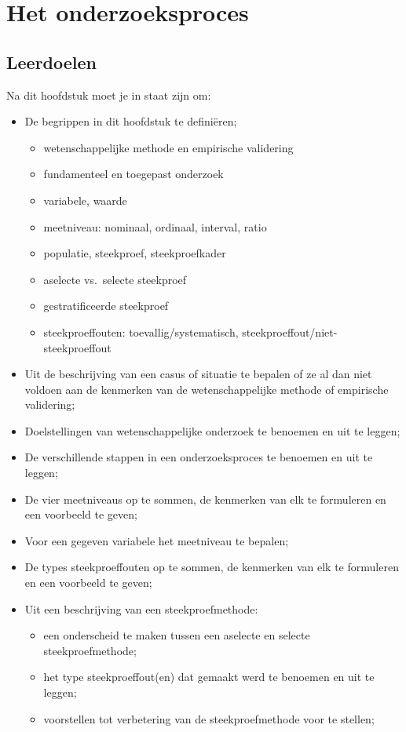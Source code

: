 \chapter{Het onderzoeksproces}
\label{ch:onderzoeksproces}

\section{Leerdoelen}
\label{sec:onderzoeksproces-leerdoelen}

Na dit hoofdstuk moet je in staat zijn om:

\begin{itemize}
  \item De begrippen in dit hoofdstuk te defini\"eren;
    \begin{itemize}
      \item wetenschappelijke methode en empirische validering
      \item fundamenteel en toegepast onderzoek
      \item variabele, waarde
      \item meetniveau: nominaal, ordinaal, interval, ratio
      \item populatie, steekproef, steekproefkader
      \item aselecte vs.~selecte steekproef
      \item gestratificeerde steekproef
      \item steekproeffouten: toevallig/systematisch, steekproeffout/niet-steekproeffout
    \end{itemize}
  \item Uit de beschrijving van een casus of situatie te bepalen of ze al dan niet voldoen aan de kenmerken van de wetenschappelijke methode of empirische validering;
  \item Doelstellingen van wetenschappelijke onderzoek te benoemen en uit te leggen;
  \item De verschillende stappen in een onderzoeksproces te benoemen en uit te leggen;
  \item De vier meetniveaus op te sommen, de kenmerken van elk te formuleren en een voorbeeld te geven;
  \item Voor een gegeven variabele het meetniveau te bepalen;
  \item De types steekproeffouten op te sommen, de kenmerken van elk te formuleren en een voorbeeld te geven;
  \item Uit een beschrijving van een steekproefmethode:
    \begin{itemize}
      \item een onderscheid te maken tussen een aselecte en selecte steekproefmethode;
      \item het type steekproeffout(en) dat gemaakt werd te benoemen en uit te leggen;
      \item voorstellen tot verbetering van de steekproefmethode voor te stellen;
    \end{itemize}
\end{itemize}

